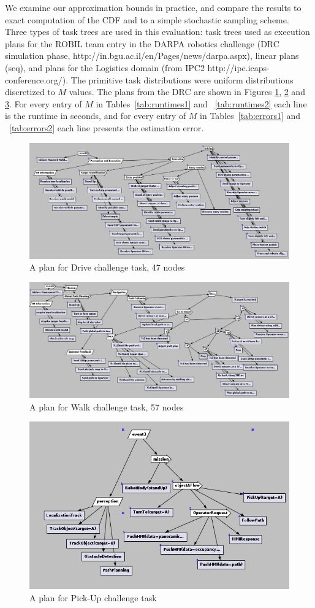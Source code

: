 \documentclass{article}
\begin{document}
We examine our approximation bounds in practice, and compare the results to
exact computation of the CDF and to a simple stochastic sampling scheme. Three types of task trees
are used in this evaluation:
task trees used as execution plans for the ROBIL team entry in the DARPA
robotics challenge (DRC simulation phase, http://in.bgu.ac.il/en/Pages/news/dar\textunderscore pa.aspx), linear plans (seq), and plans for
the Logistics domain (from IPC2 http://ipc.icaps-conference.org/).
The primitive task distributions were uniform
distributions discretized to $M$ values.  
The plans from the DRC are shown in Figures {\ref{fig:drive}}, {\ref{fig:walk}} and {\ref{fig:pickup}}. For every entry of $M$ in Tables~\ref{tab:runtimes1} and ~\ref{tab:runtimes2} each line is the runtime in seconds, and for every entry of $M$ in Tables~\ref{tab:errors1} and ~\ref{tab:errors2} each line presents the estimation error.


\begin{figure}
	\includegraphics[width=.49\textwidth]{plan1}
	\caption{A plan for Drive challenge task, 47 nodes}
	\label{fig:drive}
\end{figure}

\begin{figure}
	\includegraphics[width=.49\textwidth]{plan2}
	\caption{A plan for Walk challenge task, 57 nodes}
	\label{fig:walk}
\end{figure}


\begin{figure}
	\includegraphics[width=.49\textwidth]{plan31}
	\caption{A plan for Pick-Up challenge task}
	\label{fig:pickup}
\end{figure}
\end{document}
